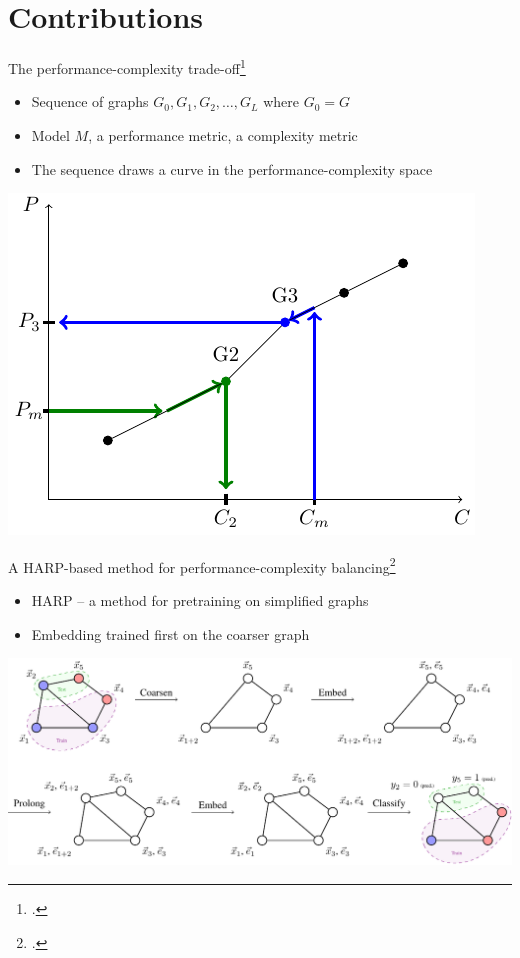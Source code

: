 \documentclass[10pt]{beamer}
\begin{document}
\section{Contributions}

\begin{frame}{The performance-complexity trade-off\footcite{prochazka_scalable_2022, dedic_balancing_2023, dedic_balancing_2024}}
	\begin{itemize}
		\item Sequence of graphs \( G_0, G_1, G_2, \dots, G_L \) where \( G_0 = G \)
		\item Model \( M \), a performance metric, a complexity metric
		\item The sequence draws a curve in the performance-complexity space
	\end{itemize}

	\vfill

	\centering
	\includegraphics[width=0.6\linewidth]{images/performance-complexity-schema/performance-complexity-schema.pdf}
\end{frame}

\begin{frame}{A HARP-based method for performance-complexity balancing\footcite{dedic_balancing_2024}}
	\begin{itemize}
		\item HARP -- a method for pretraining on simplified graphs
		\item Embedding trained first on the coarser graph
	\end{itemize}

	\vfill

	\centering
	\includegraphics[width=0.9\linewidth]{images/harp-overview/harp-overview.pdf}
\end{frame}
\end{document}
